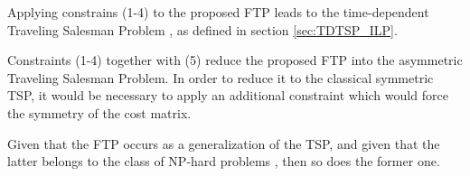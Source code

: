 Applying constrains (1-4) to the proposed FTP leads to the time-dependent Traveling Salesman Problem , as defined in section \ref{sec:TDTSP_ILP}.

Constraints (1-4) together with (5) reduce the proposed FTP into the asymmetric Traveling Salesman Problem. In order to reduce it to the classical symmetric TSP, it would be necessary to apply an additional constraint which would force the symmetry of the cost matrix.

Given that the FTP occurs as a generalization of the TSP, and given that the latter belongs to the class of NP-hard problems \cite{np_completeness}, then so does the former one.



